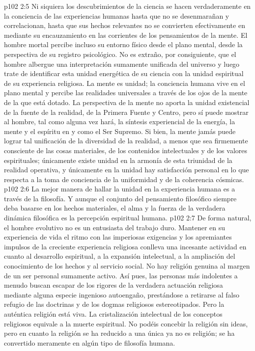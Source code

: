 \vs p102 2:5 Ni siquiera los descubrimientos de la ciencia se hacen verdaderamente  en la conciencia de las experiencias humanas hasta que no se desenmarañan y correlacionan, hasta que sus hechos relevantes no se convierten efectivamente en  mediante su encauzamiento en las corrientes de los pensamientos de la mente. El hombre mortal percibe incluso su entorno físico desde el plano mental, desde la perspectiva de su registro psicológico. No es extraño, por consiguiente, que el hombre albergue una interpretación sumamente unificada del universo y luego trate de identificar esta unidad energética de su ciencia con la unidad espiritual de su experiencia religiosa. La mente es unidad; la conciencia humana vive en el plano mental y percibe las realidades universales a través de los ojos de la mente de la que está dotado. La perspectiva de la mente no aporta la unidad existencial de la fuente de la realidad, de la Primera Fuente y Centro, pero sí puede mostrar al hombre, tal como alguna vez hará, la síntesis experiencial de la energía, la mente y el espíritu en y como el Ser Supremo. Si bien, la mente jamás puede lograr tal unificación de la diversidad de la realidad, a menos que sea firmemente consciente de las cosas materiales, de los contenidos intelectuales y de los valores espirituales; únicamente existe unidad en la armonía de esta triunidad de la realidad operativa, y únicamente en la unidad hay satisfacción personal en lo que respecta a la toma de conciencia de la uniformidad y de la coherencia cósmicas.
\vs p102 2:6 La mejor manera de hallar la unidad en la experiencia humana es a través de la filosofía. Y aunque el conjunto del pensamiento filosófico siempre deba basarse en los hechos materiales, el alma y la fuerza de la verdadera dinámica filosófica es la percepción espiritual humana.
\vs p102 2:7 \pc De forma natural, el hombre evolutivo no es un entusiasta del trabajo duro. Mantener en su experiencia de vida el ritmo con las imperiosas exigencias y los apremiantes impulsos de la creciente experiencia religiosa conlleva una incesante actividad en cuanto al desarrollo espiritual, a la expansión intelectual, a la ampliación del conocimiento de los hechos y al servicio social. No hay religión genuina al margen de un ser personal sumamente activo. Así pues, las personas más indolentes a menudo buscan escapar de los rigores de la verdadera actuación religiosa mediante alguna especie ingenioso autoengaño, prestándose a retirarse al falso refugio de las doctrinas y de los dogmas religiosos estereotipados. Pero la auténtica religión está viva. La cristalización intelectual de los conceptos religiosos equivale a la muerte espiritual. No podéis concebir la religión sin ideas, pero en cuanto la religión se ha reducido a una única  ya no es religión; se ha convertido meramente en algún tipo de filosofía humana.

